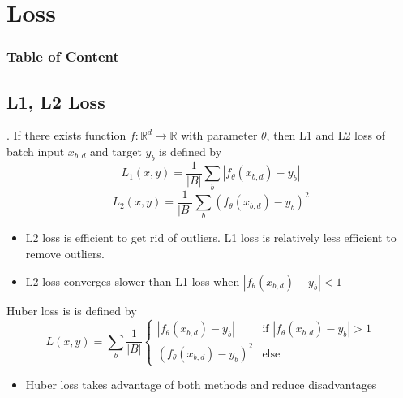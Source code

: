 \documentclass[8pt]{beamer}
\newcommand{\mbb}[1]{\mathbb{#1}}
\newcommand{\abs}[1]{\left\lvert #1 \right\rvert}
\begin{document}
\section{Loss}

\begingroup
    \begin{frame}
        \begin{multicols}{2}
            \frametitle{Table of Content}
            \tableofcontents
        \end{multicols}
    \end{frame}
\endgroup

\subsection{L1, L2 Loss}

\begin{frame}{.}
    If there exists function $f: \mbb{R}^d \to \mbb{R}$ with parameter $\theta$, then L1 and L2 loss of batch input $x_{b,d}$ and target $y_{b}$ is defined by
    \[
    L_1(x,y) = \frac{1}{\abs{B}}\sum_{b}\abs{f_\theta(x_{b,d}) - y_{b}}
    \]
    \[
    L_2(x,y) = \frac{1}{\abs{B}}\sum_{b} (f_\theta(x_{b,d}) - y_{b})^2
    \]

    \begin{itemize}
        \item L2 loss is efficient to get rid of outliers. L1 loss is relatively less efficient to remove outliers.
        \item L2 loss converges slower than L1 loss when $\abs{f_\theta(x_{b,d}) - y_b} < 1$
    \end{itemize}

    Huber loss is is defined by
    \[
        L(x,y)=\sum_b \frac{1}{\abs{B}}\begin{cases}
            \abs{f_\theta(x_{b,d}) - y_b} & \text{if } \abs{f_\theta(x_{b,d}) - y_b} > 1 \\
            (f_\theta(x_{b,d}) - y_b)^2 & \text{else} 
        \end{cases}
    \]
    \begin{itemize}
        \item Huber loss takes advantage of both methods and reduce disadvantages
    \end{itemize}
\end{frame}
\end{document}
